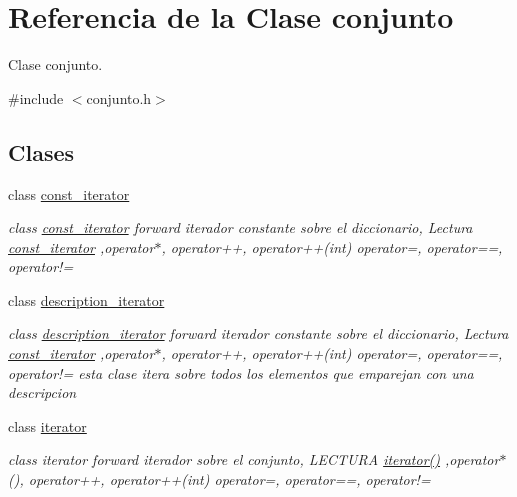 \hypertarget{classconjunto}{}\section{Referencia de la Clase conjunto}
\label{classconjunto}


Clase conjunto.  




{\ttfamily \#include $<$conjunto.\+h$>$}

\subsection*{Clases}
\begin{DoxyCompactItemize}
\item 
class \hyperlink{classconjunto_1_1const__iterator}{const\+\_\+iterator}
\begin{DoxyCompactList}\small\item\em class \hyperlink{classconjunto_1_1const__iterator}{const\+\_\+iterator} forward iterador constante sobre el diccionario, Lectura \hyperlink{classconjunto_1_1const__iterator}{const\+\_\+iterator} ,operator$\ast$, operator++, operator++(int) operator=, operator==, operator!= \end{DoxyCompactList}\item 
class \hyperlink{classconjunto_1_1description__iterator}{description\+\_\+iterator}
\begin{DoxyCompactList}\small\item\em class \hyperlink{classconjunto_1_1description__iterator}{description\+\_\+iterator} forward iterador constante sobre el diccionario, Lectura \hyperlink{classconjunto_1_1const__iterator}{const\+\_\+iterator} ,operator$\ast$, operator++, operator++(int) operator=, operator==, operator!= esta clase itera sobre todos los elementos que emparejan con una descripcion \end{DoxyCompactList}\item 
class \hyperlink{classconjunto_1_1iterator}{iterator}
\begin{DoxyCompactList}\small\item\em class iterator forward iterador sobre el conjunto, L\+E\+C\+T\+U\+R\+A \hyperlink{classconjunto_1_1iterator_ae3ade272e78f6888c39ad44a8b4b152a}{iterator()} ,operator$\ast$(), operator++, operator++(int) operator=, operator==, operator!= \end{DoxyCompactList}\end{DoxyCompactItemize}
